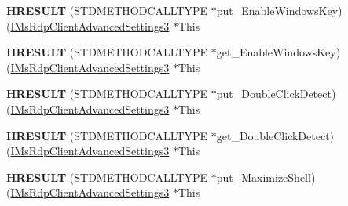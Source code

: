 \begin{DoxyCompactItemize}
\item 
\mbox{\label{struct_m_s_t_s_c_lib_1_1_i_ms_rdp_client_advanced_settings3_vtbl_a25109e4172940d70accf854081287883}} 
{\bfseries H\+R\+E\+S\+U\+LT} (S\+T\+D\+M\+E\+T\+H\+O\+D\+C\+A\+L\+L\+T\+Y\+PE $\ast$put\+\_\+\+Enable\+Windows\+Key)(\hyperlink{interface_m_s_t_s_c_lib_1_1_i_ms_rdp_client_advanced_settings3}{I\+Ms\+Rdp\+Client\+Advanced\+Settings3} $\ast$This
\item 
\mbox{\label{struct_m_s_t_s_c_lib_1_1_i_ms_rdp_client_advanced_settings3_vtbl_aa52b1a6a4b698edf67102fbd1c02a18a}} 
{\bfseries H\+R\+E\+S\+U\+LT} (S\+T\+D\+M\+E\+T\+H\+O\+D\+C\+A\+L\+L\+T\+Y\+PE $\ast$get\+\_\+\+Enable\+Windows\+Key)(\hyperlink{interface_m_s_t_s_c_lib_1_1_i_ms_rdp_client_advanced_settings3}{I\+Ms\+Rdp\+Client\+Advanced\+Settings3} $\ast$This
\item 
\mbox{\label{struct_m_s_t_s_c_lib_1_1_i_ms_rdp_client_advanced_settings3_vtbl_a83de852bebb464223fa9cee485f41e43}} 
{\bfseries H\+R\+E\+S\+U\+LT} (S\+T\+D\+M\+E\+T\+H\+O\+D\+C\+A\+L\+L\+T\+Y\+PE $\ast$put\+\_\+\+Double\+Click\+Detect)(\hyperlink{interface_m_s_t_s_c_lib_1_1_i_ms_rdp_client_advanced_settings3}{I\+Ms\+Rdp\+Client\+Advanced\+Settings3} $\ast$This
\item 
\mbox{\label{struct_m_s_t_s_c_lib_1_1_i_ms_rdp_client_advanced_settings3_vtbl_a0bd524d31e5a03f402094db20ceb7da5}} 
{\bfseries H\+R\+E\+S\+U\+LT} (S\+T\+D\+M\+E\+T\+H\+O\+D\+C\+A\+L\+L\+T\+Y\+PE $\ast$get\+\_\+\+Double\+Click\+Detect)(\hyperlink{interface_m_s_t_s_c_lib_1_1_i_ms_rdp_client_advanced_settings3}{I\+Ms\+Rdp\+Client\+Advanced\+Settings3} $\ast$This
\item 
\mbox{\label{struct_m_s_t_s_c_lib_1_1_i_ms_rdp_client_advanced_settings3_vtbl_a033ca331eaca1dc3fe1a1dc81ba2316d}} 
{\bfseries H\+R\+E\+S\+U\+LT} (S\+T\+D\+M\+E\+T\+H\+O\+D\+C\+A\+L\+L\+T\+Y\+PE $\ast$put\+\_\+\+Maximize\+Shell)(\hyperlink{interface_m_s_t_s_c_lib_1_1_i_ms_rdp_client_advanced_settings3}{I\+Ms\+Rdp\+Client\+Advanced\+Settings3} $\ast$This
\item 

\end{DoxyCompactItemize}
